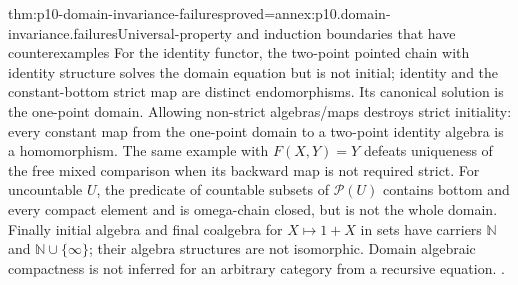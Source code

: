 \begin{hbtheorem}{thm:p10-domain-invariance-failures}{proved=annex:p10.domain-invariance.failures}{Universal-property and induction boundaries that have counterexamples}
For the identity functor, the two-point pointed chain with
identity structure solves the domain equation but is not initial;
identity and the constant-bottom strict map are distinct
endomorphisms. Its canonical solution is the one-point domain.
Allowing non-strict algebras/maps destroys strict initiality:
every constant map from the one-point domain to a two-point
identity algebra is a homomorphism. The same example with
\(F(X,Y)=Y\) defeats uniqueness of the free mixed comparison
when its backward map is not required strict.
For uncountable \(U\), the predicate of countable subsets of
\(\mathcal P(U)\) contains bottom and every compact element
and is omega-chain closed, but is not the whole domain.
Finally initial algebra and final coalgebra for \(X\mapsto1+X\)
in sets have carriers \(\mathbb N\) and
\(\mathbb N\cup\{\infty\}\); their algebra structures are
not isomorphic. Domain algebraic compactness is not inferred
for an arbitrary category from a recursive equation.
\cite[Exercises~5.4.11(5)--(7), p.~83; pp.~13,18--23]
{AbramskyJungCorrectedExpandedDomainTheory}.
\end{hbtheorem}
